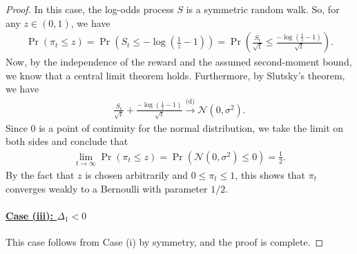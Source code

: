 \documentclass[10pt,a4paper]{amsart}
\begin{document}
\begin{proof}
In this case, the log-odds process $S$ is a symmetric random walk.
So, for any $z \in (0,1)$, we have
\begin{align*}
    \Pr(\pi_t \leq z) = \Pr \left( S_t \leq - \log \left( \frac 1 z - 1 \right) \right) = \Pr \left( \frac{S_t}{\sqrt t} \leq \frac {- \log \left( \frac 1 z - 1 \right)} {\sqrt t} \right).
\end{align*}
Now, by the independence of the reward and the assumed second-moment bound, we know that a central limit theorem holds.
Furthermore, by Slutsky's theorem, we have
\begin{align*}
    \frac{S_t}{\sqrt t} + \frac {- \log \left( \frac 1 z - 1 \right)} {\sqrt t} \stackrel{\text{(d)}}{\longrightarrow} \mathcal N(0, \sigma^2).
\end{align*}
Since $0$ is a point of continuity for the normal distribution, we take the limit on both sides and conclude that
\begin{align*}
    \lim_{t \to \infty} \Pr(\pi_t \leq z) = \Pr(\mathcal N(0, \sigma^2) \leq 0) = \frac 1 2.
\end{align*}
By the fact that $z$ is chosen arbitrarily and $0 \leq \pi_t \leq 1$, this shows that $\pi_t$ converges weakly to a Bernoulli with parameter $1/2$.

\paragraph{\underline{Case (iii): $\Delta_1 < 0$}}

This case follows from Case (i) by symmetry, and the proof is complete. 

\end{proof}
\end{document}

